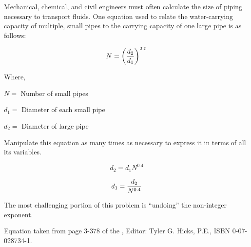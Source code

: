 

Mechanical, chemical, and civil engineers must often calculate the size of piping necessary to transport fluids.  One equation used to relate the water-carrying capacity of multiple, small pipes to the carrying capacity of one large pipe is as follows:

$$N = \biggl({d_2 \over d_1}\biggr)^{2.5}$$

\noindent
Where,

$N =$ Number of small pipes

$d_1 =$ Diameter of each small pipe

$d_2 =$ Diameter of large pipe

\vskip 10pt

Manipulate this equation as many times as necessary to express it in terms of all its variables.







$$d_2 = d_1 N^{0.4}$$

$$d_1 = {d_2 \over N^{0.4}}$$







The most challenging portion of this problem is ``undoing'' the non-integer exponent.

\vskip 10pt

Equation taken from page 3-378 of the , Editor: Tyler G. Hicks, P.E., ISBN 0-07-028734-1.




